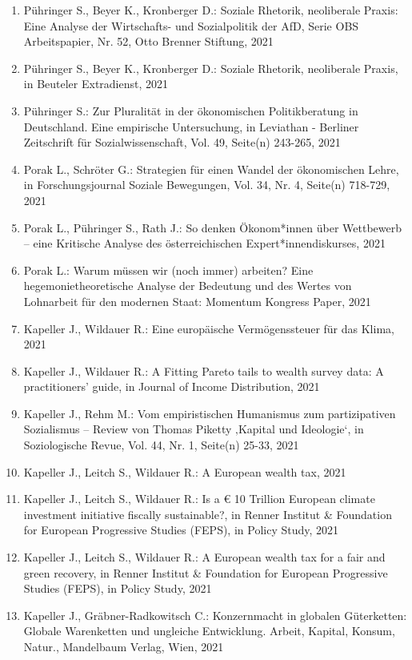 \begin{enumerate}
	 \item Pühringer S., Beyer K., Kronberger D.: Soziale Rhetorik, neoliberale Praxis: Eine Analyse der Wirtschafts- und Sozialpolitik der AfD, Serie OBS Arbeitspapier, Nr. 52, Otto Brenner Stiftung, 2021
	 \item Pühringer S., Beyer K., Kronberger D.: Soziale Rhetorik, neoliberale Praxis, in Beuteler Extradienst, 2021
	 \item Pühringer S.: Zur Pluralität in der ökonomischen Politikberatung in Deutschland. Eine empirische Untersuchung, in Leviathan - Berliner Zeitschrift für Sozialwissenschaft, Vol. 49, Seite(n) 243-265, 2021
	 \item Porak L., Schröter G.: Strategien für einen Wandel der ökonomischen Lehre, in Forschungsjournal Soziale Bewegungen, Vol. 34, Nr. 4, Seite(n) 718-729, 2021
	 \item Porak L., Pühringer S., Rath J.: So denken Ökonom*innen über Wettbewerb – eine Kritische Analyse des österreichischen Expert*innendiskurses, 2021
	 \item Porak L.: Warum müssen wir (noch immer) arbeiten? Eine hegemonietheoretische Analyse der Bedeutung und des Wertes von Lohnarbeit für den modernen Staat: Momentum Kongress Paper, 2021
	 \item Kapeller J., Wildauer R.: Eine europäische Vermögenssteuer für das Klima, 2021
	 \item Kapeller J., Wildauer R.: A Fitting Pareto tails to wealth survey data: A practitioners’ guide, in Journal of Income Distribution, 2021
	 \item Kapeller J., Rehm M.: Vom empiristischen Humanismus zum partizipativen Sozialismus – Review von Thomas Piketty ‚Kapital und Ideologie‘, in Soziologische Revue, Vol. 44, Nr. 1, Seite(n) 25-33, 2021
	 \item Kapeller J., Leitch S., Wildauer R.: A European wealth tax, 2021
	 \item Kapeller J., Leitch S., Wildauer R.: Is a € 10 Trillion European climate investment initiative fiscally sustainable?, in Renner Institut & Foundation for European Progressive Studies (FEPS), in Policy Study, 2021
	 \item Kapeller J., Leitch S., Wildauer R.: A European wealth tax for a fair and green recovery, in Renner Institut & Foundation for European Progressive Studies (FEPS), in Policy Study, 2021
	 \item Kapeller J., Gräbner-Radkowitsch C.: Konzernmacht in globalen Güterketten: Globale Warenketten und ungleiche Entwicklung. Arbeit, Kapital, Konsum, Natur., Mandelbaum Verlag, Wien, 2021

\end{enumerate}
